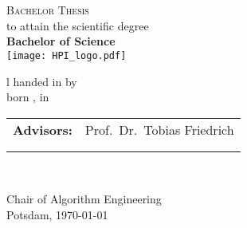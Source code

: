 \thispagestyle{empty}
\begin{center}
    {\Huge \textbf{\printTitle}}\\[4 ex]
    {\Large \textbf{\printGermanTitle}}\\[4 ex]
    {\Large\textsc{Bachelor Thesis}}\\[4 ex]
    {\large
        to attain the scientific degree\\[4 ex]
        \textbf{Bachelor of Science}
    }
   \\[5 ex]
    \vfill
    \texttt{[image: HPI\_logo.pdf]}\\[8 ex]
    \begin{tabular}{l}
        handed in by \textbf{\printAuthor}\\[1.1 ex]
        born \printDateOfBirth, in \printPlaceOfBirth\\[3 ex]
        \begin{tabular}{@{}ll@{}}
  \textbf{Advisors:} & Prof.~Dr.~Tobias Friedrich\\
              & \printAdvisorOne\\
              & \printAdvisorTwo
        \end{tabular}
        \\[5 ex]
    \end{tabular}

    Chair of Algorithm Engineering\\[5 ex]

    Potsdam, \today
\end{center}
%
%
